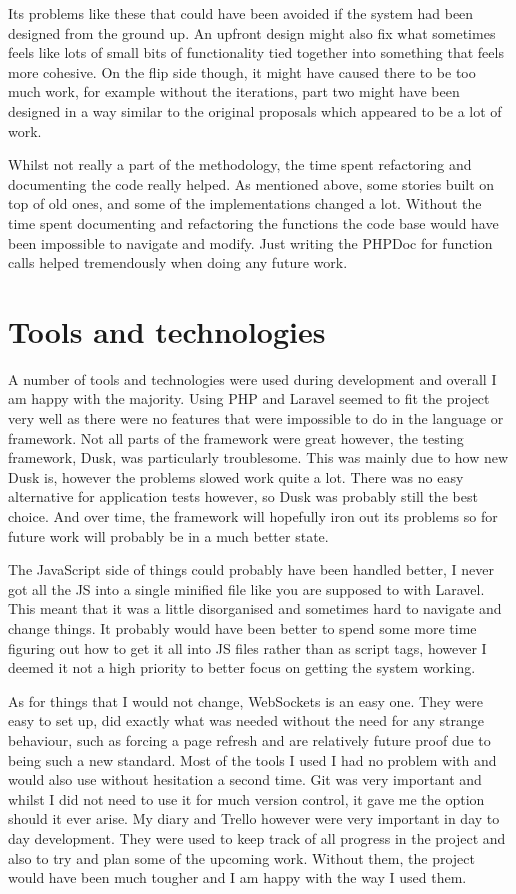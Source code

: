Its problems like these that could have been avoided if the system had been designed from the ground up. An upfront design might also fix what sometimes feels like lots of small bits of functionality tied together into something that feels more cohesive. On the flip side though, it might have caused there to be too much work, for example without the iterations, part two might have been designed in a way similar to the original proposals which appeared to be a lot of work.

Whilst not really a part of the methodology, the time spent refactoring and documenting the code really helped. As mentioned above, some stories built on top of old ones, and some of the implementations changed a lot. Without the time spent documenting and refactoring the functions the code base would have been impossible to navigate and modify. Just writing the PHPDoc for function calls helped tremendously when doing any future work.

\section{Tools and technologies}
A number of tools and technologies were used during development and overall I am happy with the majority. Using PHP and Laravel seemed to fit the project very well as there were no features that were impossible to do in the language or framework. Not all parts of the framework were great however, the testing framework, Dusk, was particularly troublesome. This was mainly due to how new Dusk is, however the problems slowed work quite a lot. There was no easy alternative for application tests however, so Dusk was probably still the best choice. And over time, the framework will hopefully iron out its problems so for future work will probably be in a much better state. 

The JavaScript side of things could probably have been handled better, I never got all the JS into a single minified file like you are supposed to with Laravel. This meant that it was a little disorganised and sometimes hard to navigate and change things. It probably would have been better to spend some more time figuring out how to get it all into JS files rather than as script tags, however I deemed it not a high priority to better focus on getting the system working.

As for things that I would not change, WebSockets is an easy one. They were easy to set up, did exactly what was needed without the need for any strange behaviour, such as forcing a page refresh and are relatively future proof due to being such a new standard. Most of the tools I used I had no problem with and would also use without hesitation a second time. Git was very important and whilst I did not need to use it for much version control, it gave me the option should it ever arise. My diary and Trello however were very important in day to day development. They were used to keep track of all progress in the project and also to try and plan some of the upcoming work. Without them, the project would have been much tougher and I am happy with the way I used them.

